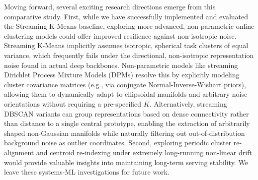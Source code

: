 Moving forward, several exciting research directions emerge from this comparative study. First, while we have successfully implemented and evaluated the Streaming K-Means baseline, exploring more advanced, non-parametric online clustering models could offer improved resilience against non-isotropic noise. Streaming K-Means implicitly assumes isotropic, spherical task clusters of equal variance, which frequently fails under the directional, non-isotropic representation noise found in actual deep backbones. Non-parametric models like streaming Dirichlet Process Mixture Models (DPMs) resolve this by explicitly modeling cluster covariance matrices (e.g., via conjugate Normal-Inverse-Wishart priors), allowing them to dynamically adapt to ellipsoidal manifolds and arbitrary noise orientations without requiring a pre-specified $K$. Alternatively, streaming DBSCAN variants can group representations based on dense connectivity rather than distance to a single central prototype, enabling the extraction of arbitrarily shaped non-Gaussian manifolds while naturally filtering out out-of-distribution background noise as outlier coordinates. Second, exploring periodic cluster re-alignment and centroid re-indexing under extremely long-running non-linear drift would provide valuable insights into maintaining long-term serving stability. We leave these systems-ML investigations for future work.
\vfil
